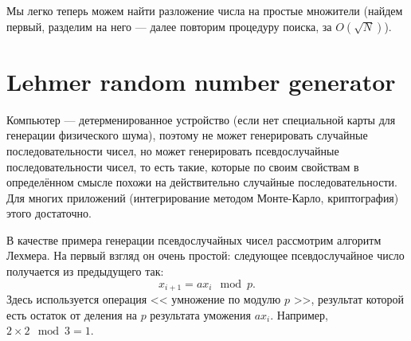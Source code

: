 \documentclass{book}
\begin{document}
Мы легко теперь можем найти разложение числа на простые множители (найдем первый, разделим на него
--- далее повторим процедуру поиска, за $O(\sqrt{N})$).

\section{Lehmer random number generator}

Компьютер --- детерменированное устройство (если нет специальной карты для генерации физического
шума), поэтому не может генерировать случайные последовательности чисел, но может генерировать
псевдослучайные последовательности чисел, то есть такие, которые по своим свойствам в определённом
смысле похожи на действительно случайные последовательности. Для многих приложений (интегрирование
методом Монте-Карло, криптография) этого достаточно.

В качестве примера генерации псевдослучайных чисел рассмотрим алгоритм Лехмера. На первый взгляд он
очень простой: следующее псевдослучайное число получается из предыдущего так:
\begin{equation}
    x_{i + 1} = a x_i \mod p.
\end{equation}
Здесь используется операция << умножение по модулю $p$ >>, результат которой есть остаток от
деления на $p$ результата уможения $a x_i$. Например, $2 \times 2 \mod 3 = 1$.
\end{document}
